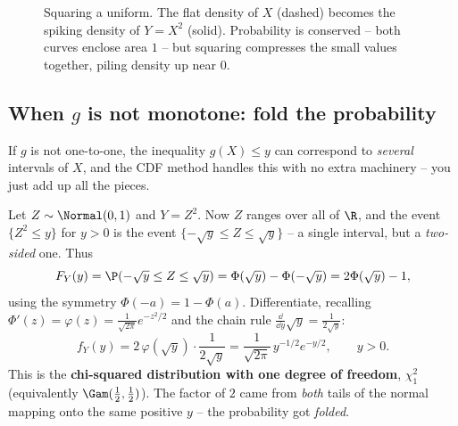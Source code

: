 \begin{figure}[H]
\centering
{}
\caption{Squaring a uniform. The flat density of $X$ (dashed) becomes the spiking density
of $Y=X^2$ (solid). Probability is conserved -- both curves enclose area $1$ -- but
squaring compresses the small values together, piling density up near $0$.}
\label{ch16:fig-square}
\end{figure}

\subsection{When $g$ is not monotone: fold the probability}

If $g$ is not one-to-one, the inequality $g(X)\le y$ can correspond to \emph{several}
intervals of $X$, and the CDF method handles this with no extra machinery -- you just add
up all the pieces.

\begin{example}[$Y = X^2$ for a standard normal -- the chi-squared]
\label{ch16:normal-square}
Let $Z \sim \Normal(0,1)$ and $Y = Z^2$. Now $Z$ ranges over all of $\R$, and the event
$\{Z^2 \le y\}$ for $y > 0$ is the event $\{-\sqrt{y} \le Z \le \sqrt{y}\}$ -- a single
interval, but a \emph{two-sided} one. Thus
\[
  F_Y(y) = \P(-\sqrt{y} \le Z \le \sqrt{y}) = \Phi(\sqrt{y}) - \Phi(-\sqrt{y})
         = 2\Phi(\sqrt{y}) - 1,
\]
using the symmetry $\Phi(-a) = 1 - \Phi(a)$. Differentiate, recalling
$\Phi'(z) = \varphi(z) = \tfrac{1}{\sqrt{2\pi}}e^{-z^2/2}$ and the chain rule
$\tfrac{\dd}{\dd y}\sqrt{y} = \tfrac{1}{2\sqrt{y}}$:
\[
  f_Y(y) = 2\,\varphi(\sqrt{y})\cdot \frac{1}{2\sqrt{y}}
         = \frac{1}{\sqrt{2\pi}}\, y^{-1/2} e^{-y/2}, \qquad y > 0.
\]
This is the \textbf{chi-squared distribution with one degree of freedom}, $\chi^2_1$
(equivalently $\Gam(\tfrac12,\tfrac12)$). The factor of $2$ came from \emph{both} tails of
the normal mapping onto the same positive $y$ -- the probability got \emph{folded}.
\end{example}

